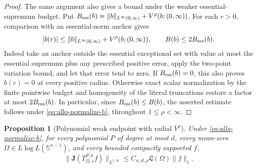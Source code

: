 \documentclass[11pt]{article}
\numberwithin{equation}{section}
\newtheorem{proposition}[theorem]{Proposition}
\theoremstyle{remark}
\theoremstyle{definition}
\newcommand{\Sph}{\mathbb S}
\begin{document}
\begin{proof}
The same argument also gives a bound under the weaker essential-supremum
budget. Put
$B_{\rm ess}(b)=\|b\|_{L^\infty(0,\infty)}+V^\rho(b;(0,\infty))$.
For each $r>0$, comparison with an essential-norm anchor gives
\[
 |b(r)|\le\|b\|_{L^\infty(0,\infty)}+V^\rho(b;(0,\infty)),
 \qquad B(b)\le2B_{\rm ess}(b).
\]
Indeed take an anchor outside the essential exceptional set with value
at most the essential supremum plus any prescribed positive error,
apply the two-point variation bound, and let that error tend to zero.
If $B_{\rm ess}(b)=0$, this also proves $b(r)=0$ at every positive
radius.  Otherwise exact scalar normalization by the finite pointwise
budget and homogeneity of the literal truncations restore a factor
at most $2B_{\rm ess}(b)$. In particular, since
$B_{\rm ess}(b)\le B(b)$, the asserted estimate follows under
\eqref{eq:allq-normalize-b}, throughout $1\le\rho<\infty$.
\end{proof}

\begin{proposition}[Polynomial weak endpoint with radial $V^\rho$]
\label{prop:allq-polynomial-weak}
Under \eqref{eq:allq-normalize-b}, for every polynomial $P$ of degree at
most $d$, every mean-zero $\Omega\in L\log L(\Sph^{n-1})$, and every
bounded compactly supported $f$,
\begin{equation}\label{eq:allq-polynomial-weak}
 \|\mathbf J(T^{P,b}_{\Omega,\varepsilon}f)\|_{L^{1,\infty}}
 \le C_{n,d,\rho}\mathfrak L(\Omega)\|f\|_1.
\end{equation}
\end{proposition}
\end{document}
